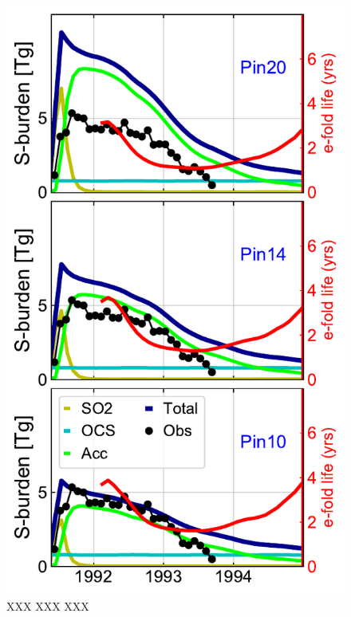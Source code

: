 \documentclass[acpd]{copernicus}
\newcommand\pinb{{\bf Pin10}\xspace}
\newcommand\pinc{{\bf Pin14}\xspace}
\newcommand\pind{{\bf Pin20}\xspace}
\begin{document}
\newpage
\begin{figure}
\includegraphics[width=.6\textwidth,height=.8\textheight,trim={0.1cm 0.1cm 0.1cm 0.1cm},clip]{Pin_burden.pdf}
\caption{XXX XXX XXX}
\label{fig:pburden}
\end{figure}






\end{document}
